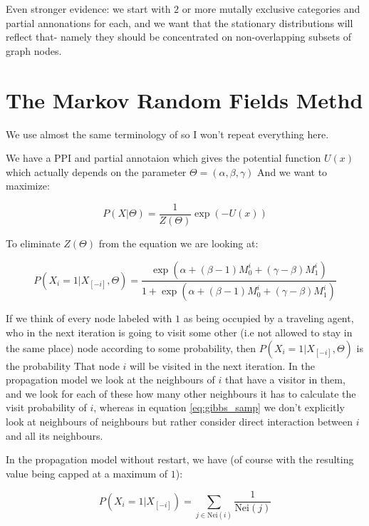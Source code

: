 \documentclass[a4paper,10pt]{article}
\theoremstyle{definition}
\theoremstyle{remark}
\theoremstyle{plain}
\begin{document}
Even stronger evidence: we start with $2$ or more mutally exclusive categories and partial annonations for each,
and we want that the stationary distributions will reflect that- namely they should be concentrated on non-overlapping subsets
of graph nodes.



\section{The Markov Random Fields Methd}
We use almost the same terminology of \textcite{deng2002prediction}
so I won't repeat everything here.

We have a PPI and partial annotaion which gives the potential function $U(x)$
which actually depends on the parameter $\Theta =(\alpha, \beta, \gamma)$
And we want to maximize:

\begin{equation} \label{eq:gibbs_dist}
P(X | \Theta) = \frac{1}{Z(\Theta)}\exp(-U(x))
\end{equation}

To eliminate $Z(\Theta)$ from the equation we are looking at:

\begin{equation} \label{eq:gibbs_samp}
P(X_i=1 | X_{[-i]}, \Theta) =
\frac{\exp(\alpha + (\beta -1)M_0^{i} + (\gamma - \beta)M_1^{i})}{
1 + \exp(\alpha + (\beta -1)M_0^{i} + (\gamma - \beta)M_1^{i})}
\end{equation}

If we think of every node labeled with $1$ as being occupied by a traveling
agent, who in the next iteration is going to visit some other (i.e not allowed
to stay in the same place) node according to some
probability, then $P(X_i = 1 | X_{[-i]}, \Theta)$ is the probability 
That node $i$ will be visited in the next iteration. In the propagation model
we look at the neighbours of $i$ that have a visitor in them, and we 
look for each of these how many other neighbours it has to calculate the 
visit probability of $i$, whereas in equation \eqref{eq:gibbs_samp} we don't
explicitly look at neighbours of neighbours but rather consider direct
interaction between $i$ and all its neighbours.

In the propagation model without restart, we have (of course with 
the resulting
value being capped at a maximum of $1$):

\begin{equation}
\label{eq:gibb_propagation}
P(X_i=1 | X_{[-i]}) = 
\sum_{j \in \text{Nei}(i)} \frac{1}{\text{Nei}(j)}
\end{equation}
\end{document}
